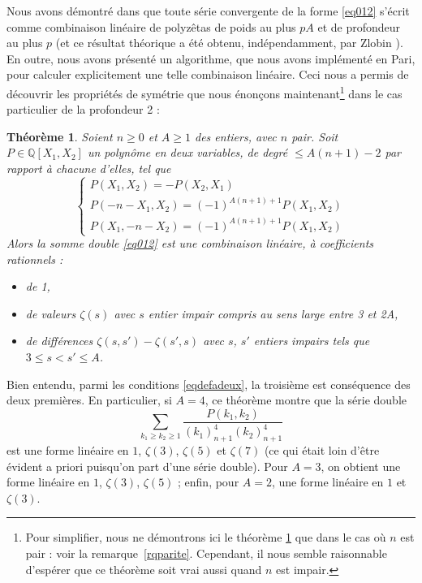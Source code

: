 \documentclass[12pt,francais, reqno]{smfart}
\numberwithin{equation}{section}
\newcommand{\Q}{\mathbb Q}
\newtheorem{Th}{Th\'eor\`eme}
\begin{document}
Nous avons d\'emontr\'e dans \cite{CFRalgo} que toute s\'erie convergente de la forme 
\eqref{eq012}  s'\'ecrit comme combinaison 
lin\'eaire de polyz\^etas de poids au plus $pA$ et de profondeur au plus $p$ (et ce r\'esultat th\'eorique a \'et\'e obtenu, ind\'ependamment, par Zlobin \cite{ZlobinZametki2005}). 
En outre, nous avons pr\'esent\'e un algorithme, que nous avons impl\'ement\'e \cite{CFRweb}
en Pari, pour calculer explicitement une telle  combinaison lin\'eaire. Ceci 
nous a permis de d\'ecouvrir les propri\'et\'es de sym\'etrie que nous 
\'enon\c cons maintenant\footnote{Pour simplifier, nous ne d\'emontrons ici  
le th\'eor\`eme \ref{thprof2} que dans le cas o\`u $n$ est pair : voir la remarque~\ref{rqparite}. Cependant, il nous semble raisonnable d'esp\'erer que ce th\'eor\`eme soit vrai aussi quand $n$ est impair.}  
dans le cas particulier de la profondeur 2 : 

\bigskip

\begin{Th} \label{thprof2}
Soient  $n \geq 0$ et $A \geq 1$ des entiers, avec $n$ pair. 
Soit $P \in \Q[X_1,   X_2]$ un polyn\^ome en deux variables, de degr\'e $\leq A(n+1)-2$ par 
rapport \`a chacune d'elles, tel que
\begin{equation} \label{eqdefadeux}
\left\{
\begin{array}{l}
P(X_1, X_2) = - P(X_2, X_1) \\
P(-n-X_1, X_2 ) = (-1)^{A(n+1)+1} P( X_1, X_2 )\\
P(X_1, -n-X_2 ) = (-1)^{A(n+1)+1} P( X_1, X_2 )
\end{array}
\right.
\end{equation}
 Alors la somme double  \eqref{eq012} est une combinaison lin\'eaire, \`a coefficients rationnels :
 \begin{itemize}
 \item de 1, 
 \item de valeurs $\zeta(s)$ avec $s$ entier impair compris au sens large entre 3 et 2A,
 \item de diff\'erences $\zeta(s,s') - \zeta(s',s)$ avec $s$, $s'$ entiers impairs tels que $3 \leq s < s' \leq A$.
 \end{itemize} 
\end{Th}

Bien entendu, parmi les conditions \eqref{eqdefadeux}, la troisi\`eme est cons\'equence des deux premi\`eres. 
En particulier, si $A=4$, ce th\'eor\`eme montre que la s\'erie double
$$
\sum_{k_1 \geq   k_2 \geq 1} 
\frac{P(k_1,  k_2)}{(k_1)_{n+1}^{4}  (k_2)_{n+1}^{4} }
$$
est une forme lin\'eaire en $1$, $\zeta(3)$,  $\zeta(5)$ et  $\zeta(7)$ (ce qui \'etait 
loin d'\^etre \'evident a priori puisqu'on part d'une s\'erie double). Pour $A=3$, on obtient 
 une forme lin\'eaire en $1$, $\zeta(3)$,  $\zeta(5)$ ; enfin, pour $A=2$, une forme lin\'eaire en $1$ et $\zeta(3)$. 
\end{document}
